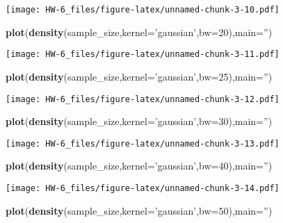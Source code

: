 \documentclass[]{article}
\newenvironment{Shaded}{\begin{snugshade}}{\end{snugshade}}
\newcommand{\DataTypeTok}[1]{\textcolor[rgb]{0.13,0.29,0.53}{#1}}
\newcommand{\DecValTok}[1]{\textcolor[rgb]{0.00,0.00,0.81}{#1}}
\newcommand{\KeywordTok}[1]{\textcolor[rgb]{0.13,0.29,0.53}{\textbf{#1}}}
\newcommand{\NormalTok}[1]{#1}
\newcommand{\StringTok}[1]{\textcolor[rgb]{0.31,0.60,0.02}{#1}}
\begin{document}
\texttt{[image: HW-6\_files/figure-latex/unnamed-chunk-3-10.pdf]}

\begin{Shaded}
\begin{Highlighting}[]
\KeywordTok{plot}\NormalTok{(}\KeywordTok{density}\NormalTok{(sample_size,}\DataTypeTok{kernel=}\StringTok{'gaussian'}\NormalTok{,}\DataTypeTok{bw=}\DecValTok{20}\NormalTok{),}\DataTypeTok{main=}\StringTok{''}\NormalTok{)}
\end{Highlighting}
\end{Shaded}

\texttt{[image: HW-6\_files/figure-latex/unnamed-chunk-3-11.pdf]}

\begin{Shaded}
\begin{Highlighting}[]
\KeywordTok{plot}\NormalTok{(}\KeywordTok{density}\NormalTok{(sample_size,}\DataTypeTok{kernel=}\StringTok{'gaussian'}\NormalTok{,}\DataTypeTok{bw=}\DecValTok{25}\NormalTok{),}\DataTypeTok{main=}\StringTok{''}\NormalTok{)}
\end{Highlighting}
\end{Shaded}

\texttt{[image: HW-6\_files/figure-latex/unnamed-chunk-3-12.pdf]}

\begin{Shaded}
\begin{Highlighting}[]
\KeywordTok{plot}\NormalTok{(}\KeywordTok{density}\NormalTok{(sample_size,}\DataTypeTok{kernel=}\StringTok{'gaussian'}\NormalTok{,}\DataTypeTok{bw=}\DecValTok{30}\NormalTok{),}\DataTypeTok{main=}\StringTok{''}\NormalTok{)}
\end{Highlighting}
\end{Shaded}

\texttt{[image: HW-6\_files/figure-latex/unnamed-chunk-3-13.pdf]}

\begin{Shaded}
\begin{Highlighting}[]
\KeywordTok{plot}\NormalTok{(}\KeywordTok{density}\NormalTok{(sample_size,}\DataTypeTok{kernel=}\StringTok{'gaussian'}\NormalTok{,}\DataTypeTok{bw=}\DecValTok{40}\NormalTok{),}\DataTypeTok{main=}\StringTok{''}\NormalTok{)}
\end{Highlighting}
\end{Shaded}

\texttt{[image: HW-6\_files/figure-latex/unnamed-chunk-3-14.pdf]}

\begin{Shaded}
\begin{Highlighting}[]
\KeywordTok{plot}\NormalTok{(}\KeywordTok{density}\NormalTok{(sample_size,}\DataTypeTok{kernel=}\StringTok{'gaussian'}\NormalTok{,}\DataTypeTok{bw=}\DecValTok{50}\NormalTok{),}\DataTypeTok{main=}\StringTok{''}\NormalTok{)}
\end{Highlighting}
\end{Shaded}
\end{document}
